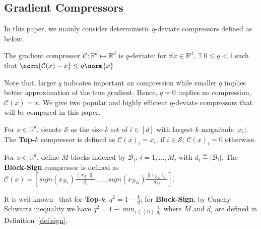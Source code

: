 \documentclass[11pt]{article}
\begin{document}

\subsection{Gradient Compressors}

In this paper, we mainly consider deterministic $q$-deviate compressors defined as below.

\begin{assumption}\label{ass:quant} The gradient compressor $\mathcal C:\mathbb R^d\mapsto \mathbb R^d$ is $q$-deviate: for $\forall x\in\mathbb R^d$, $\exists$ $0\leq q < 1$ such that $\norm{\mathcal C(x)-x} \leq q \norm{x}$.
\end{assumption}
Note that, larger $q$ indicates important an compression while smaller $q$ implies better approximation of the true gradient. 
Hence, $q=0$ implies no compression, \ie~$\mathcal C(x)=x$. 
We give two popular and highly efficient $q$-deviate compressors that will be compared in this paper.

\begin{definition}[Top-$k$]\label{def:topk}
For $x\in\mathbb R^d$, denote $\mathcal S$ as the size-$k$ set of $i\in[d]$ with largest $k$ magnitude $|x_i|$. The \textbf{Top-$k$} compressor is defined as $\mathcal C(x)_i=x_i$, if $i\in\mathcal S$; $\mathcal C(x)_i=0$ otherwise.
\end{definition}

\begin{definition}\label{def:sign}
For $x\in\mathbb R^d$, define $M$ blocks indexed by $\mathcal B_i$, $i=1,...,M$, with $d_i\eqdef |\mathcal B_i|$. The \textbf{Block-Sign} compressor is defined as $\mathcal C(x)=[sign(x_{\mathcal B_1})\frac{\|x_{\mathcal B_1}\|_1}{d_1},..., sign(x_{\mathcal B_M}) \frac{\|x_{\mathcal B_M}\|_1}{d_M}]$. 
\end{definition}

\begin{Remark}
It is well-known~\cite{stich2018sparsified,Proc:Zheng_NIPS19} that for \textbf{Top-$k$}, $q^2=1-\frac{k}{d}$; for \textbf{Block-Sign}, by Cauchy-Schwartz inequality we have $q^2=1-\min_{i\in [M]} \frac{1}{d_i}$ where $M$ and $d_i$ are defined in Definition~\ref{def:sign}.
\end{Remark}
\end{document}
